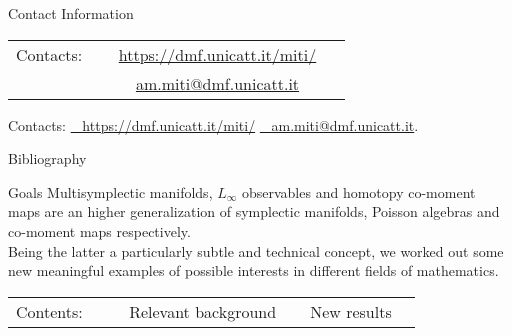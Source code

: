\documentclass[final,a0paper,20pt,
						pdftex,
            pdfauthor={Antonio Michele Miti},
            pdftitle={Homotopy title},
            pdfsubject={Poster for the conference Super19 in Luxemburg},
            pdfkeywords={Some Keywords},
            pdfproducer={Latex with hyperref, or other system},
            pdfcreator={pdflatex, or other tool}
            ]{beamer}
\begin{document}
\begin{frame}[t,shrink]
\begin{columns}
\begin{column}{\onecolwid}
		\vspace{1cm}
		\begin{alertblock}{Contact Information}
		\small
		\begin{center}
			\begin{tabular}{c c c c}
				Contacts\quad: 
				&\ComputerMouse $\;$ 
				&  \href{https://dmf.unicatt.it/miti/}{https://dmf.unicatt.it/miti/} 
				& $\;$ \ComputerMouse 
				\\
				&\Letter $\;$ 
				& \href{mailto:am.miti@dmf.unicatt.it}{am.miti@dmf.unicatt.it} 
				& $\;$ \Letter
			\end{tabular}		
		\end{center}
			Contacts: \qquad \href{https://dmf.unicatt.it/miti/}{\Mundus~ https://dmf.unicatt.it/miti/} \qquad 
			\href{mailto:am.miti@dmf.unicatt.it}{\Letter~ am.miti@dmf.unicatt.it}.
		\end{alertblock}

		\vspace{1cm}
		\begin{alertblock}{Bibliography}
			\nocite{*}
			
			\footnotesize
			
		\end{alertblock}
		
		\begin{block}{Goals}
			Multisymplectic manifolds, $L_\infty$ observables and homotopy co-moment maps are an higher generalization of symplectic manifolds, Poisson algebras and co-moment maps respectively.
			\\
			Being the latter a particularly subtle and technical concept, we worked out some new meaningful examples of possible interests in different fields of mathematics.
			
			\flushright
			\begin{tabular}{p{0.25\linewidth}p{0.4\linewidth}p{0.25\linewidth}}
				\faMapSigns Contents:
				& \rotatebox[origin=c]{90}{\faMailReply} 
				Relevant background
				& New results {\rotatebox[origin=c]{90}{\faMailReplyAll}}
			\end{tabular}		
		

\end{block}
\end{column}
\end{columns}
\end{frame}
\end{document}
